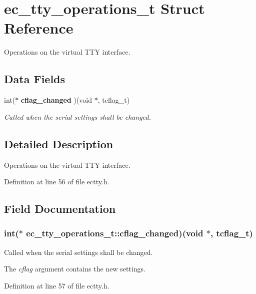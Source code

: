 \section{ec\-\_\-tty\-\_\-operations\-\_\-t \-Struct \-Reference}
\label{structec__tty__operations__t}


\-Operations on the virtual \-T\-T\-Y interface.  


\subsection*{\-Data \-Fields}
\begin{DoxyCompactItemize}
\item 
int($\ast$ {\bf cflag\-\_\-changed} )(void $\ast$, tcflag\-\_\-t)
\begin{DoxyCompactList}\small\item\em \-Called when the serial settings shall be changed. \end{DoxyCompactList}\end{DoxyCompactItemize}


\subsection{\-Detailed \-Description}
\-Operations on the virtual \-T\-T\-Y interface. 

\-Definition at line 56 of file ectty.\-h.



\subsection{\-Field \-Documentation}
\subsubsection[{cflag\-\_\-changed}]{\setlength{\rightskip}{0pt plus 5cm}int($\ast$ {\bf ec\-\_\-tty\-\_\-operations\-\_\-t\-::cflag\-\_\-changed})(void $\ast$, tcflag\-\_\-t)}\label{structec__tty__operations__t_a771c650a9bc4c8c47c28c653c63f3993}


\-Called when the serial settings shall be changed. 

\-The {\itshape cflag\/} argument contains the new settings. 

\-Definition at line 57 of file ectty.\-h.

